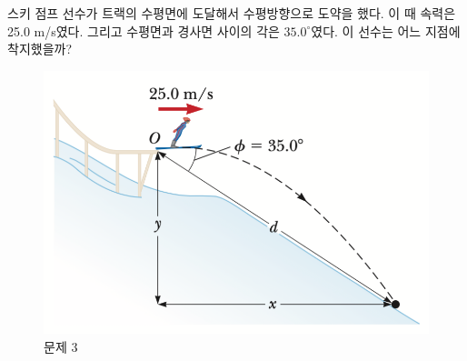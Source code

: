 \documentclass[floatfix,nofootinbib,superscriptaddress,fleqn,preprint]{revtex4}
\begin{document}
\vspace{2cm}

스키 점프 선수가 트랙의 수평면에 도달해서
수평방향으로 도약을 했다. 이 때 속력은 25.0 m/s였다. 그리고 수평면과
경사면 사이의 각은 $35.0^\circ$였다. 이 선수는 어느 지점에 착지했을까? 
\begin{figure}[ht]
  \centering
\includegraphics[scale=0.6]{Qfig4-3.pdf}  
  \caption{문제 3}
  \label{fig:2}
\end{figure}
\end{document}
